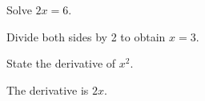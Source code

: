 \documentclass[11pt,addpoints]{exam}
\begin{document}
\begin{questions}
\question[5] Solve $2x=6$.
\begin{solution}Divide both sides by 2 to obtain $x=3$.\end{solution}
\question[5] State the derivative of $x^2$.
\begin{solution}The derivative is $2x$.\end{solution}
\end{questions}
\end{document}

